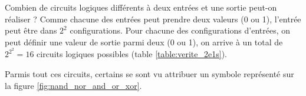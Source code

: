Combien de circuits logiques différents à deux entrées et une sortie peut-on réaliser ? Comme chacune des entrées peut prendre deux valeurs (0 ou 1), l'entrée peut être dans $2^2$ configurations. Pour chacune des configurations d'entrées, on peut définir une valeur de sortie parmi deux (0 ou 1), on arrive à un total de $2^{2^2} = 16$ circuits logiques possibles (table \ref{table:verite_2e1s}).
\begin{table}[h]
\begin{center}
\setlength\extrarowheight{5pt}
\end{center}
\caption{\label{table:verite_2e1s} Il existe $2^2 = 4$ configurations possibles d'entrées pour un circuit logique à 2 entrées. Pour chacune de ces entrées, on peut choisir 1 parmi 2 sorties pour construire, en principe, $2^{2^2} = 2^4 = 16$ tables de vérités différentes.}
\end{table}


Parmis tout ces circuits, certains se sont vu attribuer un symbole représenté sur la figure \ref{fig:nand_nor_and_or_xor}.


